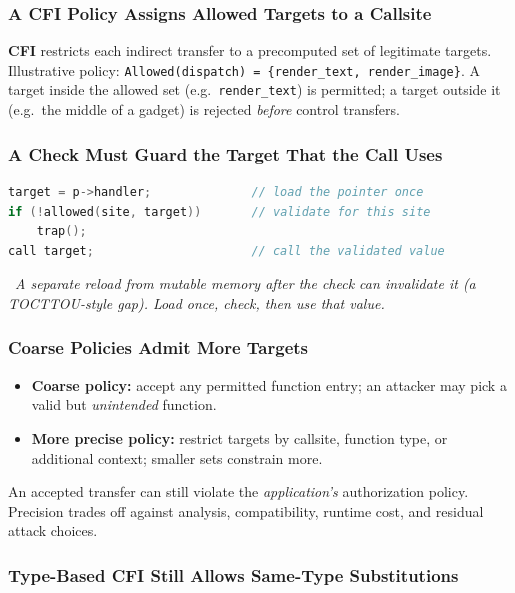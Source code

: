 \documentclass[hidelinks]{article}
\newcommand{\callout}[1]{\par\smallskip\noindent{\color{capri}$\blacktriangleright$}\ \textit{#1}\par\smallskip}
\begin{document}
\subsubsection{A CFI Policy Assigns Allowed Targets to a Callsite}

\textbf{CFI} restricts each indirect transfer to a precomputed set of legitimate targets. Illustrative policy: \texttt{Allowed(dispatch) = \{render\_text, render\_image\}}. A target inside the allowed set (e.g.\ \texttt{render\_text}) is permitted; a target outside it (e.g.\ the middle of a gadget) is rejected \emph{before} control transfers.

\subsubsection{A Check Must Guard the Target That the Call Uses}

\begin{lstlisting}[language=C]
target = p->handler;              // load the pointer once
if (!allowed(site, target))       // validate for this site
    trap();
call target;                      // call the validated value
\end{lstlisting}

\callout{A separate reload from mutable memory \emph{after} the check can invalidate it (a TOCTTOU-style gap). Load once, check, then use that value.}

\subsubsection{Coarse Policies Admit More Targets}

\begin{itemize}
    \item \textbf{Coarse policy:} accept any permitted function entry; an attacker may pick a valid but \emph{unintended} function.
    \item \textbf{More precise policy:} restrict targets by callsite, function type, or additional context; smaller sets constrain more.
\end{itemize}
An accepted transfer can still violate the \emph{application's} authorization policy. Precision trades off against analysis, compatibility, runtime cost, and residual attack choices.

\subsubsection{Type-Based CFI Still Allows Same-Type Substitutions}
\end{document}
